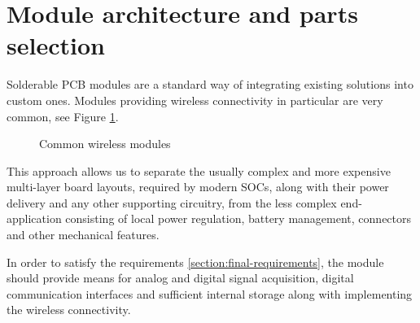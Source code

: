 \section{Module architecture and parts selection}

Solderable PCB modules are a standard way of integrating existing solutions into custom ones. Modules providing wireless connectivity in particular are very common, see Figure \ref{fig:wireless-modules}.

\begin{figure}
    \centering
    \caption{\label{fig:wireless-modules} Common wireless modules}
\end{figure}

This approach allows us to separate the usually complex and more expensive multi-layer board layouts, required by modern SOCs, along with their power delivery and any other supporting circuitry, from the less complex end-application consisting of local power regulation, battery management, connectors and other mechanical features.

In order to satisfy the requirements \ref{section:final-requirements}, the module should provide means for analog and digital signal acquisition, digital communication interfaces and sufficient internal storage along with implementing the wireless connectivity.

